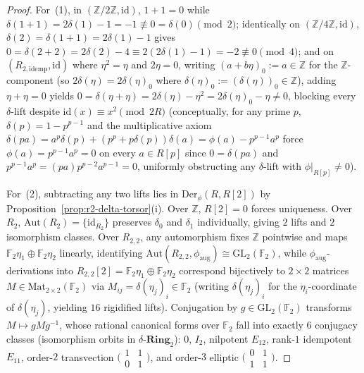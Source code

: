 \begin{proof}
For~(1), in $(\mathbb{Z}/2\mathbb{Z}, \mathrm{id})$, $1 + 1 = 0$ while $\delta(1+1) = 2\delta(1) - 1 = -1 \not\equiv 0 = \delta(0) \pmod 2$; identically on $(\mathbb{Z}/4\mathbb{Z}, \mathrm{id})$, $\delta(2) = \delta(1+1) = 2\delta(1) - 1$ gives $0 = \delta(2+2) = 2\delta(2) - 4 \equiv 2(2\delta(1) - 1) = -2 \not\equiv 0 \pmod 4$; and on $(R_{2,\mathrm{idemp}}, \mathrm{id})$ where $\eta^2 = \eta$ and $2\eta = 0$, writing $(a + b\eta)_0 := a \in \mathbb{Z}$ for the $\mathbb{Z}$-component (so $2\delta(\eta) = 2\delta(\eta)_0$ where $\delta(\eta)_0 := (\delta(\eta))_0 \in \mathbb{Z}$), adding $\eta + \eta = 0$ yields $0 = \delta(\eta + \eta) = 2\delta(\eta) - \eta^2 = 2\delta(\eta)_0 - \eta \neq 0$, blocking every $\delta$-lift despite $\mathrm{id}(x) \equiv x^2 \pmod{2R}$ (conceptually, for any prime $p$, $\delta(p) = 1 - p^{p-1}$ and the multiplicative axiom $\delta(pa) = a^p\delta(p) + (p^p + p\delta(p))\delta(a) = \phi(a) - p^{p-1}a^p$ force $\phi(a) = p^{p-1}a^p = 0$ on every $a \in R[p]$ since $0 = \delta(pa)$ and $p^{p-1}a^p = (pa)p^{p-2}a^{p-1} = 0$, uniformly obstructing any $\delta$-lift with $\phi|_{R[p]} \neq 0$).

For~(2), subtracting any two lifts lies in $\mathrm{Der}_\phi(R, R[2])$ by Proposition~\ref{prop:r2-delta-torsor}(i). Over $\mathbb{Z}$, $R[2]=0$ forces uniqueness. Over $R_2$, $\mathrm{Aut}(R_2) = \{\mathrm{id}_{R_2}\}$ preserves $\delta_0$ and $\delta_1$ individually, giving $2$ lifts and $2$ isomorphism classes. Over $R_{2,2}$, any automorphism fixes $\mathbb{Z}$ pointwise and maps $\mathbb{F}_2\eta_1 \oplus \mathbb{F}_2\eta_2$ linearly, identifying $\mathrm{Aut}(R_{2,2}, \phi_{\mathrm{aug}}) \cong \mathrm{GL}_2(\mathbb{F}_2)$, while $\phi_{\mathrm{aug}}$-derivations into $R_{2,2}[2] = \mathbb{F}_2\eta_1 \oplus \mathbb{F}_2\eta_2$ correspond bijectively to $2 \times 2$ matrices $M \in \mathrm{Mat}_{2\times 2}(\mathbb{F}_2)$ via $M_{ij} = \delta(\eta_j)_i \in \mathbb{F}_2$ (writing $\delta(\eta_j)_i$ for the $\eta_i$-coordinate of $\delta(\eta_j)$, yielding $16$ rigidified lifts). Conjugation by $g \in \mathrm{GL}_2(\mathbb{F}_2)$ transforms $M \mapsto g M g^{-1}$, whose rational canonical forms over $\mathbb{F}_2$ fall into exactly $6$ conjugacy classes (isomorphism orbits in $\delta\text{-}\mathbf{Ring}_2$): $0$, $I_2$, nilpotent $E_{12}$, rank-$1$ idempotent $E_{11}$, order-$2$ transvection $\bigl(\begin{smallmatrix}1 & 1\\ 0 & 1\end{smallmatrix}\bigr)$, and order-$3$ elliptic $\bigl(\begin{smallmatrix}0 & 1\\ 1 & 1\end{smallmatrix}\bigr)$.
\end{proof}

